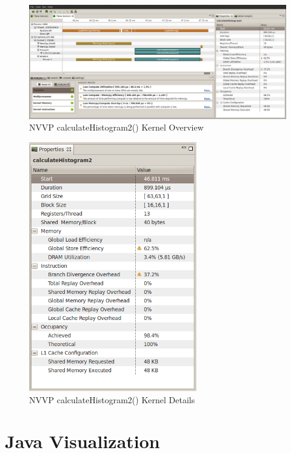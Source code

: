 \documentclass{article}
\begin{document}
\begin{figure}
\centering
\includegraphics[width=1.0\textwidth]{screenshots/nvvp/calculateHistogram2_screen1.png}
\caption{NVVP calculateHistogram2() Kernel Overview }
\label{kernel2nvvp1}
\end{figure}

\begin{figure}
\centering
\includegraphics[width=0.65\textwidth]{screenshots/nvvp/calculateHistogram2_screen3.png}
\caption{NVVP calculateHistogram2() Kernel Details}
\label{kernel2nvvp3}
\end{figure}

\section{Java Visualization}\label{visualization}
\end{document}
